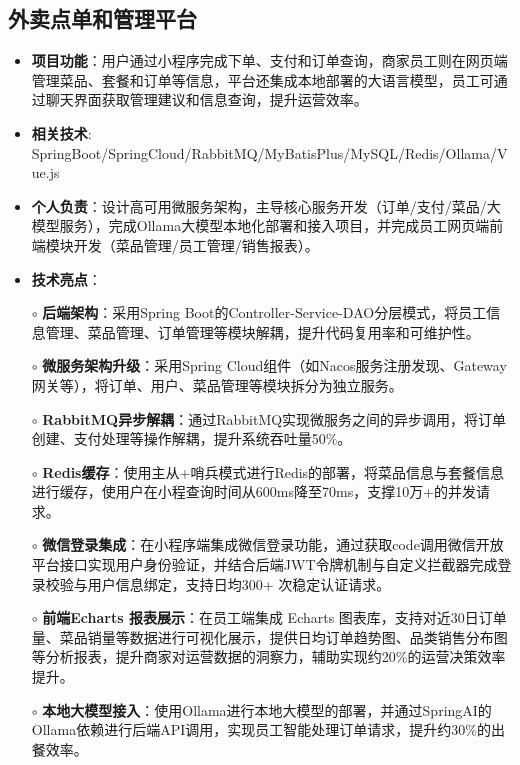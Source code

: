 \subsection{\textbf{外卖点单和管理平台} \hspace{2cm}{2024.12 -- 2025.04}}
    \begin{normalsize}
      \begin{itemize}
        \item \textbf{项目功能}：用户通过小程序完成下单、支付和订单查询，商家员工则在网页端管理菜品、套餐和订单等信息，​平台还集成本地部署的大语言模型，员工可通过聊天界面获取管理建议和信息查询，提升运营效率。
        \item \textbf{相关技术}: SpringBoot/SpringCloud/RabbitMQ/MyBatisPlus/MySQL/Redis/Ollama/Vue.js
        \item \textbf{个人负责}：设计高可用微服务架构，主导核心服务开发（订单/支付/菜品/大模型服务），完成Ollama大模型本地化部署和接入项目，并完成员工网页端前端模块开发（菜品管理/员工管理/销售报表）。
        \item \textbf{技术亮点}：
        \setlength{\itemindent}{1em} %
          \item[$\circ$] \textbf{后端架构}：采用Spring Boot的Controller-Service-DAO分层模式，将员工信息管理、菜品管理、订单管理等模块解耦，提升代码复用率和可维护性。
          \item[$\circ$] \textbf{微服务架构升级}：采用Spring Cloud组件（如Nacos服务注册发现、Gateway网关等），将订单、用户、菜品管理等模块拆分为独立服务。
          \item[$\circ$] \textbf{RabbitMQ异步解耦​​}：通过RabbitMQ实现微服务之间的异步调用，将订单创建、支付处理等操作解耦，提升系统吞吐量50\%。
          \item[$\circ$] \textbf{Redis缓存}：使用主从+哨兵模式进行Redis的部署，将菜品信息与套餐信息进行缓存，使用户在小程查询时间从600ms降至70ms，支撑10万+的并发请求。
          \item[$\circ$] \textbf{微信登录集成}：在小程序端集成微信登录功能，通过获取code调用微信开放平台接口实现用户身份验证，并结合后端JWT令牌机制与自定义拦截器完成登录校验与用户信息绑定，支持日均300+ 次稳定认证请求。
          \item[$\circ$] \textbf{前端Echarts 报表展示}：在员工端集成 Echarts 图表库，支持对近30日订单量、菜品销量等数据进行可视化展示，提供日均订单趋势图、品类销售分布图等分析报表，提升商家对运营数据的洞察力，辅助实现约20\%的运营决策效率提升。
          \item[$\circ$] \textbf{本地大模型接入}：使用Ollama进行本地大模型的部署，并通过SpringAI的Ollama依赖进行后端API调用，实现员工智能处理订单请求，提升约30\%的出餐效率。
        \end{itemize}
    \end{normalsize}
